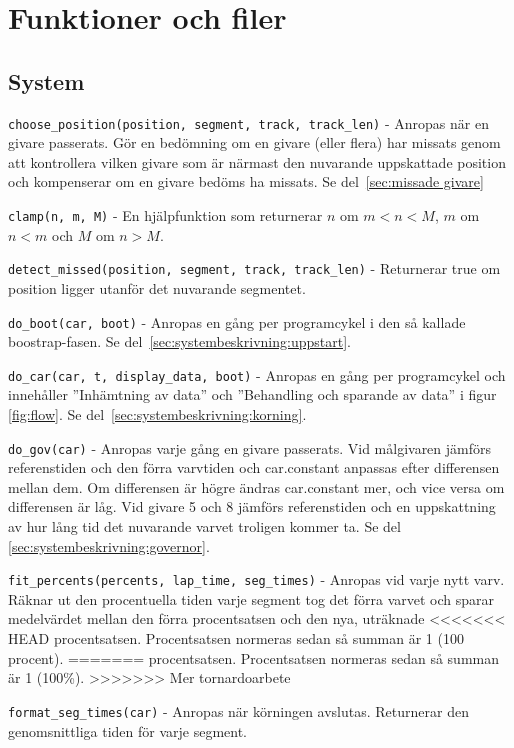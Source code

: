 \section{Funktioner och filer}

\subsection{System}
\label{app:funktioner och filer:system}

\texttt{choose\_position(position, segment, track, track\_len)} - Anropas när en
givare passerats. Gör en bedömning om en givare (eller flera) har missats genom
att kontrollera vilken givare som är närmast den nuvarande uppskattade position
och kompenserar om en givare bedöms ha missats. Se del~\ref{sec:missade givare}

\texttt{clamp(n, m, M)} - En hjälpfunktion som returnerar $n$ om $m < n < M$,
$m$ om $n < m$ och $M$ om $n > M$.

\texttt{detect\_missed(position, segment, track, track\_len)} - Returnerar true
om position ligger utanför det nuvarande segmentet.

\texttt{do\_boot(car, boot)} - Anropas en gång per programcykel i den så kallade
boostrap-fasen. Se del~\ref{sec:systembeskrivning:uppstart}.

\texttt{do\_car(car, t, display\_data, boot)} - Anropas en gång per programcykel
och innehåller ''Inhämtning av data'' och ''Behandling och sparande av data'' i
figur \ref{fig:flow}.  Se del~\ref{sec:systembeskrivning:korning}.

\texttt{do\_gov(car)} - Anropas varje gång en givare passerats. Vid målgivaren
jämförs referenstiden och den förra varvtiden och car.constant anpassas efter
differensen mellan dem. Om differensen är högre ändras car.constant mer, och
vice versa om differensen är låg. Vid givare 5 och 8 jämförs referenstiden och
en uppskattning av hur lång tid det nuvarande varvet troligen kommer ta. Se del~
\ref{sec:systembeskrivning:governor}.

\texttt{fit\_percents(percents, lap\_time, seg\_times)} - Anropas vid varje nytt
varv. Räknar ut den procentuella tiden varje segment tog det förra varvet och
sparar medelvärdet mellan den förra procentsatsen och den nya, uträknade
<<<<<<< HEAD
procentsatsen. Procentsatsen normeras sedan så summan är 1 (100 procent).
=======
procentsatsen. Procentsatsen normeras sedan så summan är 1 (100\%).
>>>>>>> Mer tornardoarbete

\texttt{format\_seg\_times(car)} - Anropas när körningen avslutas. Returnerar
den genomsnittliga tiden för varje segment.

